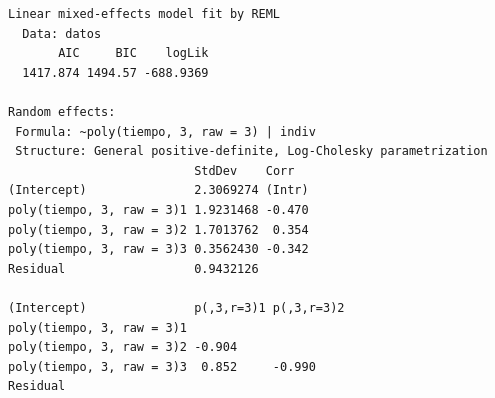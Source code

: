 \documentclass[
]{book}
\begin{document}
\begin{verbatim}
Linear mixed-effects model fit by REML
  Data: datos 
       AIC     BIC    logLik
  1417.874 1494.57 -688.9369

Random effects:
 Formula: ~poly(tiempo, 3, raw = 3) | indiv
 Structure: General positive-definite, Log-Cholesky parametrization
                          StdDev    Corr  
(Intercept)               2.3069274 (Intr)
poly(tiempo, 3, raw = 3)1 1.9231468 -0.470
poly(tiempo, 3, raw = 3)2 1.7013762  0.354
poly(tiempo, 3, raw = 3)3 0.3562430 -0.342
Residual                  0.9432126       
                                               
(Intercept)               p(,3,r=3)1 p(,3,r=3)2
poly(tiempo, 3, raw = 3)1                      
poly(tiempo, 3, raw = 3)2 -0.904               
poly(tiempo, 3, raw = 3)3  0.852     -0.990    
Residual                                       


\end{verbatim}
\end{document}

